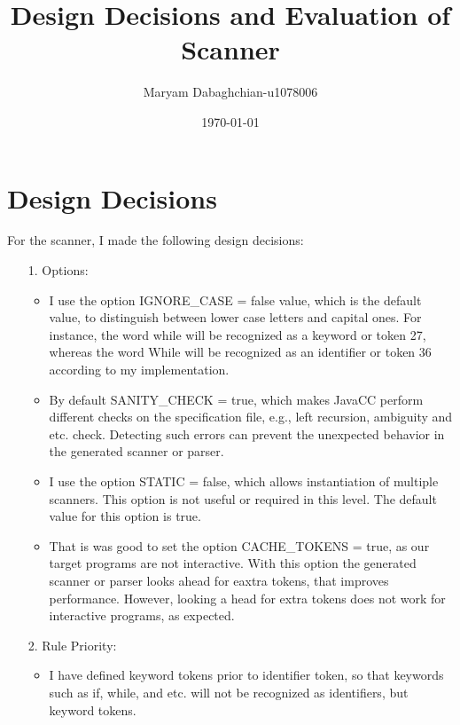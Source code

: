 \documentclass[12pt]{article}
\title{Design Decisions and Evaluation of Scanner}
\author{Maryam Dabaghchian-u1078006}
\date{\today}
\newcommand{\code}[1]{\textsf{#1}}
\begin{document}
\maketitle

\section{Design Decisions}
For the scanner, I made the following design decisions:

\begin{itemize}
	\item[1.] Options:
		\begin{itemize}
			\item I use the option \code{IGNORE\_CASE = false} value, which is 
			the default value, to distinguish between lower case letters and 
			capital ones. For instance, the word \code{while} will be recognized 
			as a keyword or token 27, whereas the word \code{While} will be 
			recognized as an identifier or token 36 according to my 
			implementation.
			\item By default \code{SANITY\_CHECK = true}, which makes JavaCC 
			perform different checks on the specification file, e.g., left 
			recursion, ambiguity and etc. check. Detecting such errors can 
			prevent the unexpected behavior in the generated scanner or parser.
			\item I use the option \code{STATIC = false}, which allows instantiation of multiple scanners. This option is not useful or required in this level. The default value for this option is \code{true}.
			\item That is was good to set the option \code{CACHE\_TOKENS = 
			true}, as our target programs are not interactive. With this option 
			the generated scanner or parser looks ahead for eaxtra tokens, that 
			improves performance. However, looking a head for extra tokens does 
			not work for interactive programs, as expected.
		\end{itemize}
	\item[2.] Rule Priority:
		\begin{itemize}
			\item I have defined keyword tokens prior to identifier token, so 
			that keywords such as \code{if}, \code{while}, and etc. will not 
			be recognized as identifiers, but keyword tokens.

\end{itemize}
\end{itemize}
\end{document}
